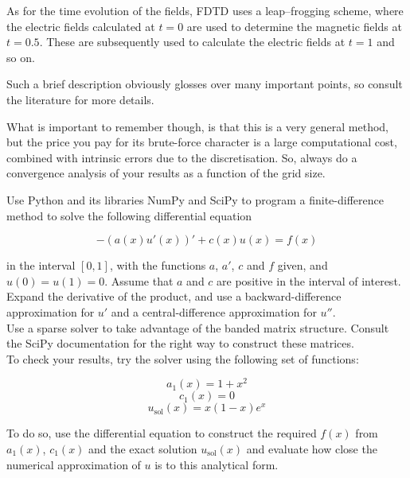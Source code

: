 As for the time evolution of the fields, FDTD uses a leap--frogging scheme, where the electric fields calculated at $t=0$ are used to determine the magnetic fields at $t=0.5$. These are subsequently used to calculate the electric fields at $t=1$ and so on.

Such a brief description obviously glosses over many important points, so consult the literature for more details.

What is important to remember though, is that this is a very general method, but the price you pay for its brute-force character is a large computational cost, combined with intrinsic errors due to the discretisation. So, always do a convergence analysis of your results as a function of the grid size.

\pagebreak

\begin{exer}
Use Python and its libraries NumPy and SciPy to program a finite-difference method to solve the following differential equation

$$ -\left(a(x) u'(x) \right)' + c(x)u(x) = f(x)$$

in the interval $[0,1]$, with the functions $a$, $a'$, $c$ and $f$ given, and $u(0) = u(1) = 0$. Assume that $a$ and $c$ are positive in the interval of interest.\\

Expand the derivative of the product, and use a backward-difference approximation for $u'$ and a central-difference approximation for $u''$. \\

Use a sparse solver to take advantage of the banded matrix structure. Consult the SciPy documentation for the right way to construct these matrices. \\

To check your results, try the solver using the following set of functions:

$$a_1(x) = 1 + x^2$$
$$c_1(x) = 0$$
$$u_{\mathrm{sol}}(x) = x(1-x) e^x $$

To do so, use the differential equation to construct the required $f(x)$ from $a_1(x)$, $c_1(x)$ and the exact solution $u_{\mathrm{sol}}(x)$ and evaluate how close the numerical approximation of $u$ is to this analytical form.

\end{exer}



\pagebreak



